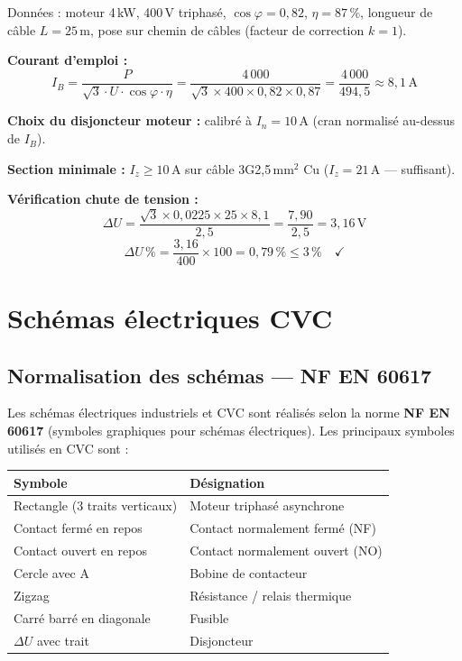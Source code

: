 \begin{exemple}[title={Choix de la section de câble — moteur pompe 4\,kW}]
  Données : moteur 4\,kW, 400\,V triphasé, $\cos\varphi = 0{,}82$, $\eta = 87\,\%$, longueur de câble $L = 25\,\text{m}$, pose sur chemin de câbles (facteur de correction $k = 1$).

  \textbf{Courant d'emploi :}
  \[
    I_B = \frac{P}{\sqrt{3} \cdot U \cdot \cos\varphi \cdot \eta} = \frac{4\,000}{\sqrt{3} \times 400 \times 0{,}82 \times 0{,}87} = \frac{4\,000}{494{,}5} \approx 8{,}1\,\text{A}
  \]

  \textbf{Choix du disjoncteur moteur :} calibré à $I_n = 10\,\text{A}$ (cran normalisé au-dessus de $I_B$).

  \textbf{Section minimale :} $I_z \geq 10\,\text{A}$ sur câble 3G2,5\,mm$^2$ Cu ($I_z = 21\,\text{A}$ — suffisant).

  \textbf{Vérification chute de tension :}
  \[
    \Delta U = \frac{\sqrt{3} \times 0{,}0225 \times 25 \times 8{,}1}{2{,}5} = \frac{7{,}90}{2{,}5} = 3{,}16\,\text{V}
  \]
  \[
    \Delta U\,\% = \frac{3{,}16}{400} \times 100 = 0{,}79\,\% \leq 3\,\% \quad \checkmark
  \]
\end{exemple}

\section{Schémas électriques CVC}

\subsection{Normalisation des schémas — NF EN 60617}

\begin{definition}
  Les schémas électriques industriels et CVC sont réalisés selon la norme \textbf{NF EN 60617} (symboles graphiques pour schémas électriques). Les principaux symboles utilisés en CVC sont :

  \begin{center}
    \begin{tabular}{ll}
      \toprule
      Symbole & Désignation \\
      \midrule
      Rectangle (3 traits verticaux) & Moteur triphasé asynchrone \\
      Contact fermé en repos & Contact normalement fermé (NF) \\
      Contact ouvert en repos & Contact normalement ouvert (NO) \\
      Cercle avec A & Bobine de contacteur \\
      Zigzag & Résistance / relais thermique \\
      Carré barré en diagonale & Fusible \\
      $\Delta U$ avec trait & Disjoncteur \\
      \bottomrule
    \end{tabular}
  \end{center}
\end{definition}


